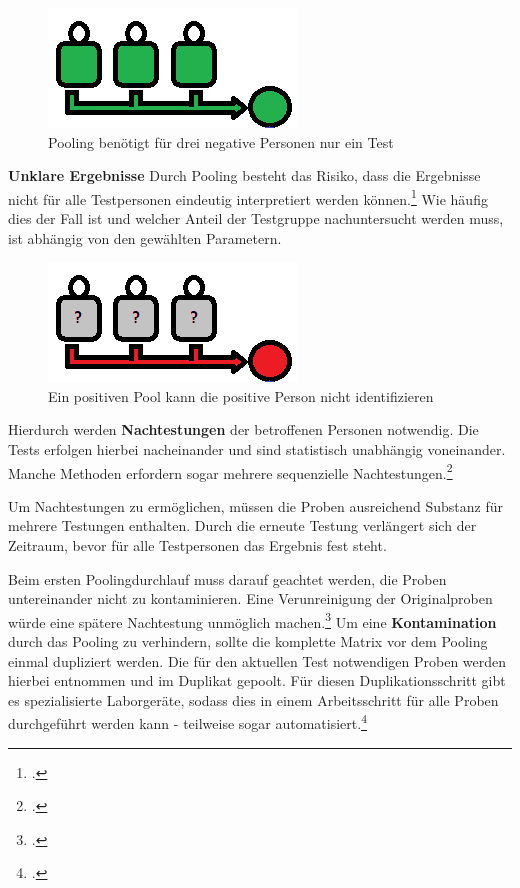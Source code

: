 \begin{figure}[h]
	\centering
	\includegraphics[width=.5\textwidth]{img/PoolAlleNegativ}
	\caption{Pooling benötigt für drei negative Personen nur ein Test\footnotemark}
\end{figure}




\textbf{Unklare Ergebnisse}\newline
Durch Pooling besteht das Risiko, dass die Ergebnisse nicht für alle Testpersonen eindeutig interpretiert werden können.\footcite{viehweger_increased_2020}
Wie häufig dies der Fall ist und welcher Anteil der Testgruppe nachuntersucht werden muss, ist abhängig von den gewählten Parametern.

\begin{figure}[h]
	\centering
	\includegraphics[width=.5\textwidth]{img/PoolPositiv}
	\caption{Ein positiven Pool kann die positive Person nicht identifizieren\footnotemark}
\end{figure}

Hierdurch werden \textbf{Nachtestungen} der betroffenen Personen notwendig.
Die Tests erfolgen hierbei nacheinander und sind statistisch unabhängig voneinander.
Manche Methoden erfordern sogar mehrere sequenzielle Nachtestungen.\footcite{verwilt_evaluation_2021}

Um Nachtestungen zu ermöglichen, müssen die Proben ausreichend Substanz für mehrere Testungen enthalten.
Durch die erneute Testung verlängert sich der Zeitraum, bevor für alle Testpersonen das Ergebnis fest steht.

Beim ersten Poolingdurchlauf muss darauf geachtet werden, die Proben untereinander nicht zu kontaminieren.
Eine Verunreinigung der Originalproben würde eine spätere Nachtestung unmöglich machen.\footcite{verwilt_evaluation_2021}
Um eine \textbf{Kontamination} durch das Pooling zu verhindern, sollte die komplette Matrix vor dem Pooling einmal dupliziert werden. 
Die für den aktuellen Test notwendigen Proben werden hierbei entnommen und im Duplikat gepoolt.
Für diesen Duplikationsschritt gibt es spezialisierte Laborgeräte, sodass dies in einem Arbeitsschritt für alle Proben durchgeführt werden kann - teilweise sogar automatisiert.\footcite{kendall_antigen-based_2021}

